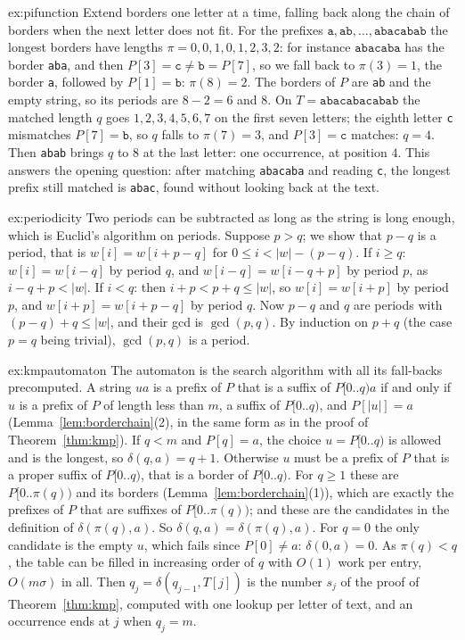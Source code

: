 \begin{solution}{ex:pifunction}
\idea Extend borders one letter at a time, falling back along the chain of borders when the next letter does not fit.
\writeup For the prefixes $\texttt a,\texttt{ab},\dots,\texttt{abacabab}$ the longest borders have lengths $\pi=0,0,1,0,1,2,3,2$: for instance $\texttt{abacaba}$ has the border \texttt{aba}, and then $P[3]=\texttt c\ne\texttt b=P[7]$, so we fall back to $\pi(3)=1$, the border \texttt a, followed by $P[1]=\texttt b$: $\pi(8)=2$. The borders of $P$ are \texttt{ab} and the empty string, so its periods are $8-2=6$ and $8$.
On $T=\texttt{abacabacabab}$ the matched length $q$ goes $1,2,3,4,5,6,7$ on the first seven letters; the eighth letter \texttt c mismatches $P[7]=\texttt b$, so $q$ falls to $\pi(7)=3$, and $P[3]=\texttt c$ matches: $q=4$. Then \texttt{abab} brings $q$ to $8$ at the last letter: one occurrence, at position $4$. This answers the opening question: after matching \texttt{abacaba} and reading \texttt c, the longest prefix still matched is \texttt{abac}, found without looking back at the text.
\end{solution}

\begin{solution}{ex:periodicity}
\idea Two periods can be subtracted as long as the string is long enough, which is Euclid's algorithm on periods.
\writeup Suppose $p>q$; we show that $p-q$ is a period, that is $w[i]=w[i+p-q]$ for $0\le i<|w|-(p-q)$. If $i\ge q$: $w[i]=w[i-q]$ by period $q$, and $w[i-q]=w[i-q+p]$ by period $p$, as $i-q+p<|w|$. If $i<q$: then $i+p<p+q\le|w|$, so $w[i]=w[i+p]$ by period $p$, and $w[i+p]=w[i+p-q]$ by period $q$.
Now $p-q$ and $q$ are periods with $(p-q)+q\le|w|$, and their gcd is $\gcd(p,q)$. By induction on $p+q$ (the case $p=q$ being trivial), $\gcd(p,q)$ is a period.
\end{solution}

\begin{solution}{ex:kmpautomaton}
\idea The automaton is the search algorithm with all its fall-backs precomputed.
\writeup A string $ua$ is a prefix of $P$ that is a suffix of $P[0..q)a$ if and only if $u$ is a prefix of $P$ of length less than $m$, a suffix of $P[0..q)$, and $P[|u|]=a$ (Lemma~\ref{lem:borderchain}(2), in the same form as in the proof of Theorem~\ref{thm:kmp}). If $q<m$ and $P[q]=a$, the choice $u=P[0..q)$ is allowed and is the longest, so $\delta(q,a)=q+1$.
Otherwise $u$ must be a prefix of $P$ that is a proper suffix of $P[0..q)$, that is a border of $P[0..q)$. For $q\ge1$ these are $P[0..\pi(q))$ and its borders (Lemma~\ref{lem:borderchain}(1)), which are exactly the prefixes of $P$ that are suffixes of $P[0..\pi(q))$; and these are the candidates in the definition of $\delta(\pi(q),a)$. So $\delta(q,a)=\delta(\pi(q),a)$. For $q=0$ the only candidate is the empty $u$, which fails since $P[0]\ne a$: $\delta(0,a)=0$.
As $\pi(q)<q$, the table can be filled in increasing order of $q$ with $O(1)$ work per entry, $O(m\sigma)$ in all. Then $q_j=\delta(q_{j-1},T[j])$ is the number $s_j$ of the proof of Theorem~\ref{thm:kmp}, computed with one lookup per letter of text, and an occurrence ends at $j$ when $q_j=m$.
\end{solution}

